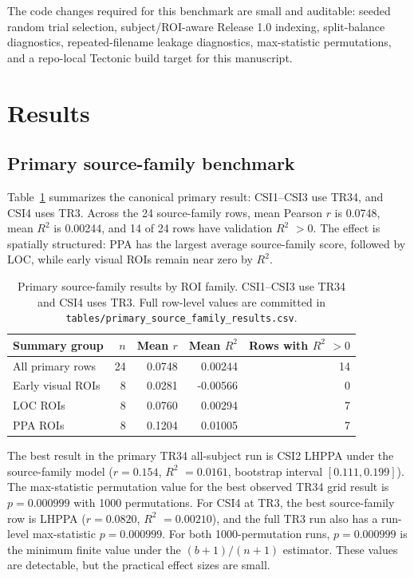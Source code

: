 \documentclass[11pt]{article}
\newcommand{\rsq}{$R^2$}
\begin{document}
The code changes required for this benchmark are small and auditable: seeded
random trial selection, subject/ROI-aware Release 1.0 indexing, split-balance
diagnostics, repeated-filename leakage diagnostics, max-statistic permutations,
and a repo-local Tectonic build target for this manuscript.

\section{Results}

\subsection{Primary source-family benchmark}

Table~\ref{tab:area-summary} summarizes the canonical primary result:
CSI1--CSI3 use TR34, and CSI4 uses TR3. Across the 24 source-family rows,
mean Pearson $r$ is 0.0748, mean \rsq{} is 0.00244, and 14 of 24 rows have
validation \rsq{} $>0$. The effect is spatially structured: PPA has the
largest average source-family score, followed by LOC, while early visual ROIs
remain near zero by \rsq{}.

\begin{table}[ht]
  \centering
  \caption{Primary source-family results by ROI family. CSI1--CSI3 use TR34 and CSI4 uses TR3. Full row-level values are committed in \texttt{tables/primary\_source\_family\_results.csv}.}
  \label{tab:area-summary}
  \begin{tabular}{lrrrr}
    \toprule
    Summary group & $n$ & Mean $r$ & Mean \rsq{} & Rows with \rsq{} $>0$ \\
    \midrule
    All primary rows & 24 & 0.0748 & 0.00244 & 14 \\
    Early visual ROIs & 8 & 0.0281 & -0.00566 & 0 \\
    LOC ROIs & 8 & 0.0760 & 0.00294 & 7 \\
    PPA ROIs & 8 & 0.1204 & 0.01005 & 7 \\
    \bottomrule
  \end{tabular}
\end{table}

The best result in the primary TR34 all-subject run is CSI2 LHPPA under the
source-family model ($r=0.154$, \rsq{} $=0.0161$, bootstrap interval
$[0.111, 0.199]$). The max-statistic permutation value for the best observed
TR34 grid result is $p=0.000999$ with 1000 permutations. For CSI4 at TR3, the
best source-family row is LHPPA ($r=0.0820$, \rsq{} $=0.00210$), and the full
TR3 run also has a run-level max-statistic $p=0.000999$. For both
1000-permutation runs, $p=0.000999$ is the minimum finite value under the
$(b+1)/(n+1)$ estimator. These values are detectable, but the practical effect
sizes are small.
\end{document}

